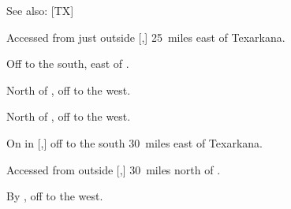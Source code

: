 
See also: [TX]

\begin{LocationList}

Accessed from  just outside [,] 25~miles east of Texarkana.

Off  to the south, east of .

North of , off  to the west.

North of , off  to the west.

On  in [,] off  to the south 30~miles east of Texarkana.

Accessed from  outside [,] 30~miles north of .

\Location{\RecruitmentAgency \Recruitment}
By , off  to the west.

\end{LocationList}
